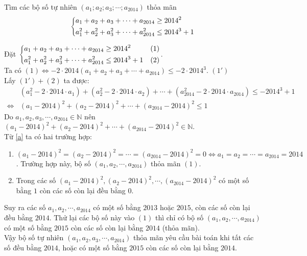 \begin{bt}%
	Tìm các bộ số tự nhiên $\left(a_1; a_2; a_3;\cdots; a_{2014}\right)$ thỏa mãn
	$$\left\{\begin{aligned}
		&a_1+  a_2 +  a_3 + \cdots +  a_{2014}\geq 2014^2\\
		&a^2_1+  a^2_2 +  a^2_3 + \cdots +  a^2_{2014}\leq 2014^3 + 1\end{aligned}\right.$$
	\loigiai
	{
		Đặt	$\left\{\begin{aligned}
			&a_1+  a_2 +  a_3 + \cdots +  a_{2014}\ge 2014^2  &(1)\\
			&a^2_1+  a^2_2 +  a^2_3 + \cdots +  a^2_{2014}\le 2014^3 + 1 &(2)\end{aligned}\right.$. \\
		Ta có $(1)\Leftrightarrow -2 \cdot 2014 \left(a_1+a_2+a_3+\cdots +a_{2014}\right) \le -2 \cdot 2014^3$. \hfill $(1')$\\
		Lấy $(1')+(2)$  ta được:
		\begin{align*}
			&\left(a_1^2-2 \cdot 2014 \cdot a_1\right)+ \left(a_2^2-2 \cdot 2014 \cdot a_2\right)+\cdots+\left(a_{2014}^2-2 \cdot 2014 \cdot a_{2014}\right)\le-2014^3+1 \\
			\Leftrightarrow &(a_1-2014)^2+(a_2-2014)^2+\cdots+(a_{2014}-2014)^2\le 1 \tag{3} \label{a}
		\end{align*}
		Do $a_1,a_2,a_3,\cdots,a_{2014} \in \mathbb{N}$ nên $(a_1-2014)^2+(a_2-2014)^2+\cdots+(a_{2014}-2014)^2 \in \mathbb{N}$.\\
		Từ \eqref{a} ta có hai trường hợp:
		\begin{enumerate}[\bfseries TH1:]
			\item $(a_1-2014)^2=(a_2-2014)^2=\cdots=(a_{2014}-2014)^2=0\Leftrightarrow a_1=a_2=\cdots=a_{2014}=2014$. Trường hợp này, bộ số $\left(a_1,a_2,\cdots,a_{2014}\right)$ thỏa mãn $(1)$.
			\item Trong các số $(a_1-2014)^2,(a_2-2014)^2,\cdots,(a_{2014}-2014)^2$ có một số bằng $1$ còn các số còn lại đều bằng $0$.
		\end{enumerate}
		Suy ra các số $a_1,a_2,\cdots,a_{2014}$ có một số bằng $2013$ hoặc $2015$, còn các số còn lại đều bằng $2014$.
		Thử lại các bộ số này vào $(1)$ thì chỉ có bộ số $\left(a_1,a_2,\cdots,a_{2014}\right)$ có một số bằng $2015$ còn các số còn lại bằng $2014$ (thỏa mãn).\\
		Vậy bộ số tự nhiên $\left(a_1,a_2,a_3,\cdots,a_{2014}\right)$ thỏa mãn yêu cầu bài toán khi tất các số đều bằng $2014$, hoặc có một số bằng $2015$ còn các số còn lại bằng $2014$.
	}
\end{bt}
